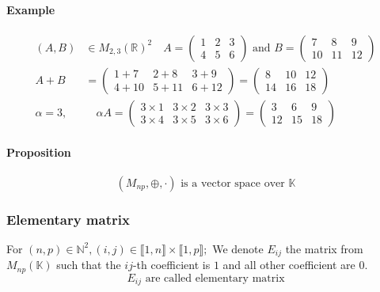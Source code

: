 \documentclass[notitlepage]{math}
\begin{document}
\paragraph{Example}
\begin{align*}
    (A,B) &\in M_{2,3}(\mathbb{R})^2 \quad A = \begin{pmatrix}
        1 & 2 & 3 \\
        4 & 5 & 6
    \end{pmatrix} \text{ and } B = \begin{pmatrix}
        7 & 8 & 9 \\
        10 & 11 & 12
    \end{pmatrix} \\
    A + B & = \begin{pmatrix}
        1 + 7 & 2 + 8 & 3 + 9 \\
        4 + 10 & 5 + 11 & 6 + 12
    \end{pmatrix} = \begin{pmatrix}
        8 & 10 & 12 \\
        14 & 16 & 18
    \end{pmatrix} \\
    \alpha = 3,& \quad \alpha A = \begin{pmatrix}
        3 \times 1 & 3 \times 2 & 3 \times 3 \\
        3 \times 4 & 3 \times 5 & 3 \times 6
    \end{pmatrix} = \begin{pmatrix}
        3 & 6 & 9 \\
        12 & 15 & 18
    \end{pmatrix}
\end{align*}
\paragraph{Proposition}
\[(M_{np}, \oplus, \cdot) \text{ is a vector space over } \mathbb{K}\]
\subsubsection{Elementary matrix}
For $(n,p) \in \mathbb{N}^2, (i,j) \in \llbracket 1,n \rrbracket \times \llbracket 1,p \rrbracket;$ We denote $E_{ij}$ the matrix from $M_{np}(\mathbb{K})$
such that the $ij$-th coefficient is $1$ and all other coefficient are $0$.
\[ E_{ij} \text{ are called elementary matrix}\]
\end{document}
